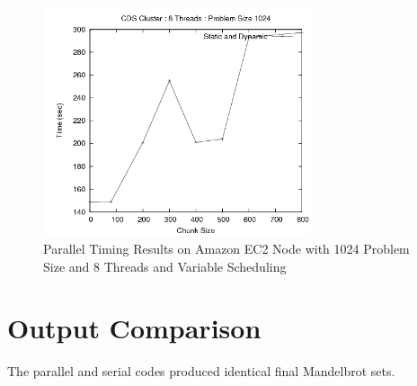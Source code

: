 \documentclass{article}
\begin{document}
\begin{figure}
\centering
\includegraphics[width=0.7\textwidth]{../data/cds_block.png}
\caption{Parallel Timing Results on Amazon EC2 Node with 1024 Problem Size and 8 Threads and Variable Scheduling}
\label{cds_chunk}
\end{figure}




\section{Output Comparison}

The parallel and serial codes produced identical final Mandelbrot sets.
\end{document}
